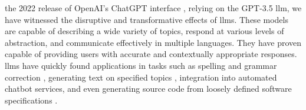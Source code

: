   the 2022 release of OpenAI's ChatGPT interface \cite{ChatGPT-Hystor_2023}, relying on the GPT-3.5 \gls{llm}, we have witnessed the disruptive and transformative effects of \glspl{llm}.  
These models are capable of describing a wide variety of topics, respond at various levels of abstraction, and communicate effectively in multiple languages. 
They have proven capable of providing users with accurate and contextually appropriate responses. \glspl{llm} have quickly found applications in tasks such as spelling and grammar correction \cite{Eker-GrammarCorrection_2023}, generating text on specified topics \cite{Adeshola-ChatGPT-Edu_2023}, integration into automated chatbot services, and even generating source code from loosely defined software specifications \cite{Feng-Software-ChatGTP_2023}.


